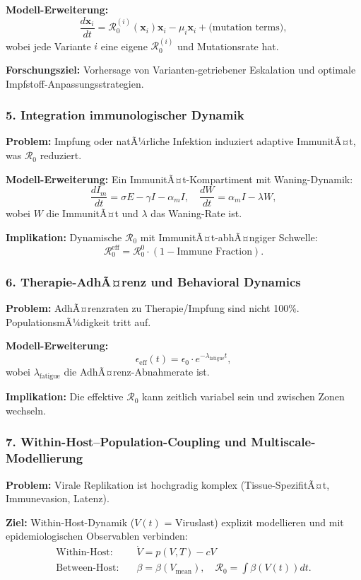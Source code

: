 ﻿\documentclass[a4paper,12pt,twoside]{article}
\theoremstyle{definition}
\begin{document}
\textbf{Modell-Erweiterung:}
\[
\frac{d \mathbf{x}_i}{dt} = \mathcal{R}_0^{(i)} (\mathbf{x}_i) \mathbf{x}_i - \mu_i \mathbf{x}_i + \text{(mutation terms)},
\]
wobei jede Variante $i$ eine eigene $\mathcal{R}_0^{(i)}$ und Mutationsrate hat.

\textbf{Forschungsziel:} Vorhersage von Varianten-getriebener Eskalation und optimale Impfstoff-Anpassungsstrategien.

\subsubsection{5. Integration immunologischer Dynamik}

\textbf{Problem:} Impfung oder natÃ¼rliche Infektion induziert adaptive ImmunitÃ¤t, was $\mathcal{R}_0$ reduziert.

\textbf{Modell-Erweiterung:} Ein ImmunitÃ¤t-Kompartiment mit Waning-Dynamik:
\[
\frac{dI_m}{dt} = \sigma E - \gamma I - \alpha_m I, \quad \frac{dW}{dt} = \alpha_m I - \lambda W,
\]
wobei $W$ die ImmunitÃ¤t und $\lambda$ das Waning-Rate ist.

\textbf{Implikation:} Dynamische $\mathcal{R}_0$ mit ImmunitÃ¤t-abhÃ¤ngiger Schwelle:
\[
\mathcal{R}_0^{\text{eff}} = \mathcal{R}_0^0 \cdot (1 - \text{Immune Fraction}).
\]

\subsubsection{6. Therapie-AdhÃ¤renz und Behavioral Dynamics}

\textbf{Problem:} AdhÃ¤renzraten zu Therapie/Impfung sind nicht 100\%. PopulationsmÃ¼digkeit tritt auf.

\textbf{Modell-Erweiterung:}
\[
\epsilon_{\text{eff}}(t) = \epsilon_0 \cdot e^{-\lambda_{\text{fatigue}} t},
\]
wobei $\lambda_{\text{fatigue}}$ die AdhÃ¤renz-Abnahmerate ist.

\textbf{Implikation:} Die effektive $\mathcal{R}_0$ kann zeitlich variabel sein und zwischen Zonen wechseln.

\subsubsection{7. Within-Host--Population-Coupling und Multiscale-Modellierung}

\textbf{Problem:} Virale Replikation ist hochgradig komplex (Tissue-SpezifitÃ¤t, Immunevasion, Latenz).

\textbf{Ziel:} Within-Host-Dynamik ($V(t)$ = Viruslast) explizit modellieren und mit epidemiologischen Observablen verbinden:
\begin{align}
\text{Within-Host:} \quad & \dot{V} = p(V, T) - c V \\
\text{Between-Host:} \quad & \beta = \beta(V_{\text{mean}}), \quad \mathcal{R}_0 = \int \beta(V(t)) dt.
\end{align}
\end{document}
